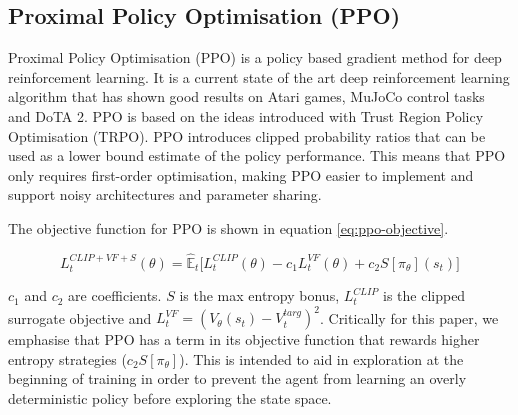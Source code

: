 \documentclass[conference]{IEEEtran}
\begin{document}
\subsection{Proximal Policy Optimisation (PPO)}

Proximal Policy Optimisation (PPO) is a policy based gradient method for deep reinforcement learning. It is a current state of the art deep reinforcement learning algorithm that has shown good results on Atari games, MuJoCo control tasks\cite{schulman2017proximal} and DoTA 2\cite{OpenAI_dota}. PPO is based on the ideas introduced with Trust Region Policy Optimisation (TRPO)\cite{schulman2015trust}. PPO introduces clipped probability ratios that can be used as a lower bound estimate of the policy performance. This means that PPO only requires first-order optimisation, making PPO easier to implement and support noisy architectures and parameter sharing.



The objective function for PPO is shown in equation \ref{eq:ppo-objective}.

\begin{equation}
    L_t^{CLIP+VF+S}(\theta) = \hat{\mathbb{E}}_t\big[L_t^{CLIP}(\theta)-c_1L_t^{VF}(\theta)+c_2S[\pi_{\theta}](s_t)\big]
    \label{eq:ppo-objective}
\end{equation}

$c_1$ and $c_2$ are coefficients. $S$ is the max entropy bonus, $L_t^{CLIP}$ is the clipped surrogate objective and $L_t^{VF} = (V_{\theta}(s_t)-V_t^{targ})^2$. Critically for this paper, we emphasise that PPO has a term in its objective function that rewards higher entropy strategies ($c_2S[\pi_{\theta}]$). This is intended to aid in exploration at the beginning of training in order to prevent the agent from learning an overly deterministic policy before exploring the state space. 
\end{document}
